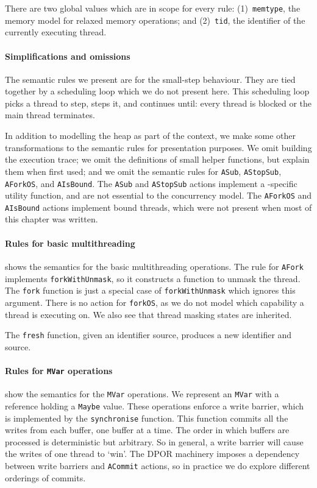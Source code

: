 There are two global values which are in scope for every rule:
(1)~\verb|memtype|, the memory model for relaxed memory operations;
and (2)~\verb|tid|, the identifier of the currently executing thread.

\paragraph{Simplifications and omissions}
The semantic rules we present are for the small-step behaviour.  They
are tied together by a scheduling loop which we do not present here.
This scheduling loop picks a thread to step, steps it, and continues
until: every thread is blocked or the main thread terminates.

In addition to modelling the heap as part of the context, we make some
other transformations to the semantic rules for presentation purposes.
We omit building the execution trace; we omit the definitions of small
helper functions, but explain them when first used; and we omit the
semantic rules for \verb|ASub|, \verb|AStopSub|, \verb|AForkOS|, and
\verb|AIsBound|.  The \verb|ASub| and \verb|AStopSub| actions
implement a \dejafu{}-specific utility function, and are not essential
to the concurrency model.  The \verb|AForkOS| and \verb|AIsBound|
actions implement bound threads, which were not present when most of
this chapter was written.

\paragraph{Rules for basic multithreading}
 shows the semantics for the basic
multithreading operations.  The rule for \verb|AFork| implements
\verb|forkWithUnmask|, so it constructs a function to unmask the
thread.  The \verb|fork| function is just a special case of
\verb|forkWithUnmask| which ignores this argument.  There is no action
for \verb|forkOS|, as we do not model which capability a thread is
executing on.  We also see that thread masking states are inherited.

The \verb|fresh| function, given an identifier source, produces a new
identifier and source.

\paragraph{Rules for \texttt{MVar} operations}
 show the semantics for the
\verb|MVar| operations.  We represent an \verb|MVar| with a reference
holding a \verb|Maybe| value.  These operations enforce a write
barrier, which is implemented by the \verb|synchronise| function.
This function commits all the writes from each buffer, one buffer at a
time.  The order in which buffers are processed is deterministic but
arbitrary.  So in general, a write barrier will cause the writes of
one thread to `win'.  The DPOR machinery imposes a dependency between
write barriers and \verb|ACommit| actions, so in practice we do
explore different orderings of commits.

